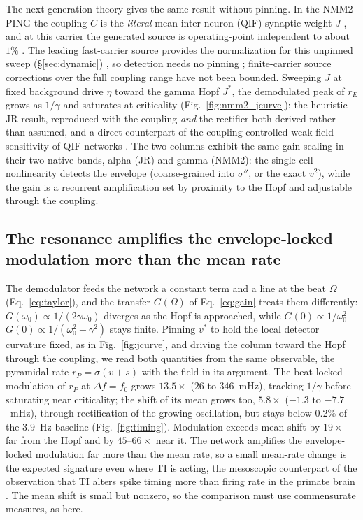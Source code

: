 \documentclass[11pt,a4paper]{article}
\newcommand{\Sig}{\sigma}
\providecommand{\DIFaddtex}[1]{{\protect\color{blue} \sf #1}} %
\providecommand{\DIFdeltex}[1]{{\protect\color{red} \scriptsize #1}} %
\providecommand{\DIFaddbegin}{} %
\providecommand{\DIFaddend}{} %
\providecommand{\DIFdelbegin}{} %
\providecommand{\DIFdelend}{} %
\providecommand{\DIFadd}[1]{\texorpdfstring{\DIFaddtex{#1}}{#1}} %
\providecommand{\DIFdel}[1]{\texorpdfstring{\DIFdeltex{#1}}{}} %
\begin{document}
The next-generation theory gives the same result without pinning. In the NMM2 PING the
coupling $C$ is the \emph{literal} mean inter-neuron (QIF) synaptic weight $J$\DIFdelbegin \DIFdel{, and at this
carrier the generated source is operating-point independent to about $1\%$
}\DIFdelend \DIFaddbegin \DIFadd{.
The leading fast-carrier source provides the normalization for this unpinned
sweep }\DIFaddend (\S\ref{sec:dynamic})\DIFdelbegin \DIFdel{, so detection needs no pinning}\DIFdelend \DIFaddbegin \DIFadd{; finite-carrier source corrections over the full
coupling range have not been bounded}\DIFaddend . Sweeping $J$ at fixed background drive
$\bar\eta$ toward the gamma Hopf $J^*$, the demodulated peak of $r_E$ grows as
$1/\gamma$ and saturates at criticality (Fig.~\ref{fig:nmm2_jcurve}): the heuristic JR
result, reproduced with the coupling \emph{and} the rectifier both derived rather than
assumed, and a direct counterpart of the coupling-controlled weak-field sensitivity of
QIF networks \cite{clusella2023}. The two columns exhibit the same gain scaling in
their two native bands, alpha (JR) and gamma (NMM2): the single-cell nonlinearity
detects the envelope (coarse-grained into $\Sig''$, or the exact $v^2$), while the
gain is a recurrent amplification set by proximity to the
Hopf and adjustable through the coupling.

\subsection{The resonance amplifies the envelope-locked modulation more than the mean rate}\label{sec:timing}
The demodulator feeds the network a constant term and a line at the beat $\Omega$
(Eq.~\eqref{eq:taylor}), and the transfer $G(\Omega)$ of Eq.~\eqref{eq:gain} treats them
differently: $G(\omega_0)\propto1/(2\gamma\omega_0)$ diverges as the Hopf is approached,
while \DIFdelbegin \DIFdel{$G(0)\propto1/\omega_0^2$ }\DIFdelend \DIFaddbegin \DIFadd{$G(0)\propto1/(\omega_0^2+\gamma^2)$ }\DIFaddend stays finite. Pinning $v^*$ to hold the local detector
curvature fixed, as in Fig.~\ref{fig:jcurve}, and driving the column toward the Hopf
through the coupling, we read both quantities from the same observable, the pyramidal
rate $r_P=\Sig(v+s)$ with the field in its argument. The beat-locked modulation of $r_P$ at
$\Delta f=f_0$ grows $13.5\times$ ($26$ to $346$~mHz), tracking $1/\gamma$ before
saturating near criticality; the shift of its mean grows too, $5.8\times$ ($-1.3$ to
$-7.7$~mHz), through rectification of the growing oscillation, but stays below $0.2\%$ of
the $3.9$~Hz baseline (Fig.~\ref{fig:timing}). Modulation exceeds mean shift by $19\times$
far from the Hopf and by $45$--$66\times$ near it. The network amplifies the
envelope-locked modulation far more than the mean rate, so a small mean-rate change is
the expected signature even where TI is acting, the mesoscopic counterpart of the
observation that TI alters spike timing more than firing rate in the primate brain
\cite{vieira2024}. The mean shift is small but nonzero, so the comparison must use
commensurate measures, as here.
\end{document}
